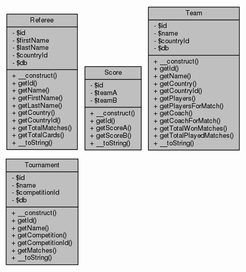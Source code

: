 \documentclass[11pt]{article}
\begin{document}
\includegraphics[scale=0.4]{UML_Referee.png}
\includegraphics[scale=0.4]{UML_Score.png}
\includegraphics[scale=0.4]{UML_Team.png}
\includegraphics[scale=0.4]{UML_Tournament.png}
\end{document}
